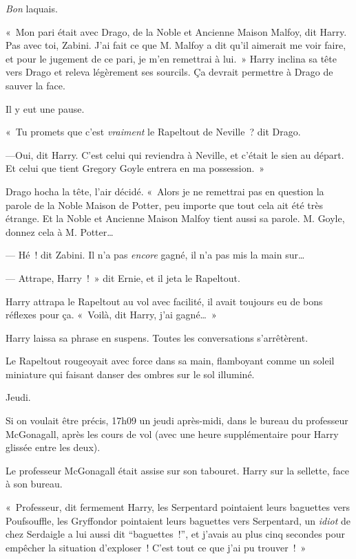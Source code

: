 \emph{Bon} laquais.

«~Mon pari était avec Drago, de la Noble et Ancienne Maison Malfoy, dit Harry. Pas avec toi, Zabini. J'ai fait ce que M. Malfoy a dit qu'il aimerait me voir faire, et pour le jugement de ce pari, je m'en remettrai à lui.~» Harry inclina sa tête vers Drago et releva légèrement ses sourcils. Ça devrait permettre à Drago de sauver la face.

Il y eut une pause.

«~Tu promets que c'est \emph{vraiment} le Rapeltout de Neville~? dit Drago.

---Oui, dit Harry. C'est celui qui reviendra à Neville, et c'était le sien au départ. Et celui que tient Gregory Goyle entrera en ma possession.~»

Drago hocha la tête, l'air décidé. «~Alors je ne remettrai pas en question la parole de la Noble Maison de Potter, peu importe que tout cela ait été très étrange. Et la Noble et Ancienne Maison Malfoy tient aussi sa parole. M. Goyle, donnez cela à M. Potter…

--- Hé~! dit Zabini. Il n'a pas \emph{encore} gagné, il n'a pas mis la main sur…

--- Attrape, Harry~!~» dit Ernie, et il jeta le Rapeltout.

Harry attrapa le Rapeltout au vol avec facilité, il avait toujours eu de bons réflexes pour ça. «~Voilà, dit Harry, j'ai gagné…~»

Harry laissa sa phrase en suspens. Toutes les conversations s'arrêtèrent.

Le Rapeltout rougeoyait avec force dans sa main, flamboyant comme un soleil miniature qui faisant danser des ombres sur le sol illuminé.

\later

Jeudi.

Si on voulait être précis, 17h09 un jeudi après-midi, dans le bureau du professeur McGonagall, après les cours de vol (avec une heure supplémentaire pour Harry glissée entre les deux).

Le professeur McGonagall était assise sur son tabouret. Harry sur la sellette, face à son bureau.

«~Professeur, dit fermement Harry, les Serpentard pointaient leurs baguettes vers Poufsouffle, les Gryffondor pointaient leurs baguettes vers Serpentard, un \emph{idiot} de chez Serdaigle a lui aussi dit “baguettes~!”, et j'avais au plus cinq secondes pour empêcher la situation d'exploser~! C'est tout ce que j'ai pu trouver~!~»

